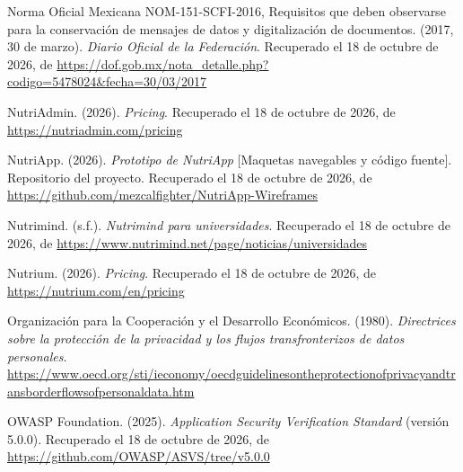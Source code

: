 \documentclass[12pt, a4paper]{article}
\begin{document}
\begin{list}{}{\setlength{\leftmargin}{1.27cm}\setlength{\itemindent}{-1.27cm}%
  \setlength{\labelwidth}{0pt}\setlength{\labelsep}{0pt}\setlength{\itemsep}{6pt}}
\item Norma Oficial Mexicana NOM-151-SCFI-2016, Requisitos que deben
  observarse para la conservación de mensajes de datos y
  digitalización de documentos. (2017, 30 de marzo). \textit{Diario
  Oficial de la Federación}.
  Recuperado el 18 de octubre de 2026, de \url{https://dof.gob.mx/nota_detalle.php?codigo=5478024&fecha=30/03/2017}
 

\item NutriAdmin. (2026). \textit{Pricing}.
  Recuperado el 18 de octubre de 2026, de \url{https://nutriadmin.com/pricing}
 
\item NutriApp. (2026). \textit{Prototipo de NutriApp} [Maquetas
  navegables y código fuente]. Repositorio del proyecto.
  Recuperado el 18 de octubre de 2026, de \url{https://github.com/mezcalfighter/NutriApp-Wireframes}
 
 
\item Nutrimind. (s.f.). \textit{Nutrimind para universidades}. Recuperado el 18 de octubre de 2026, de \url{https://www.nutrimind.net/page/noticias/universidades}
 
\item Nutrium. (2026). \textit{Pricing}.
  Recuperado el 18 de octubre de 2026, de \url{https://nutrium.com/en/pricing}

\item Organización para la Cooperación y el Desarrollo Económicos.
  (1980). \textit{Directrices sobre la protección de la privacidad
  y los flujos transfronterizos de datos personales}.
\url{https://www.oecd.org/sti/ieconomy/oecdguidelinesontheprotectionofprivacyandtransborderflowsofpersonaldata.htm}

\item OWASP Foundation. (2025). \textit{Application Security
  Verification Standard} (versión 5.0.0).
  Recuperado el 18 de octubre de 2026, de \url{https://github.com/OWASP/ASVS/tree/v5.0.0}
 




\end{list}
\end{document}
